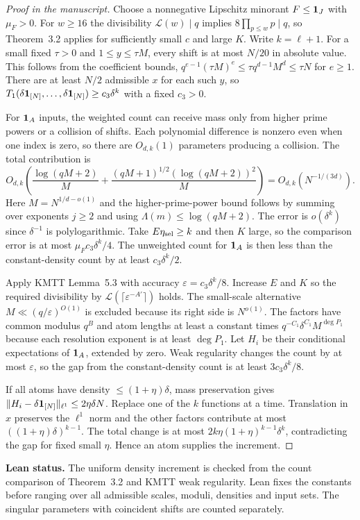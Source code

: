 \begin{proof}[Proof in the manuscript]
\leanok
{}
Choose a nonnegative Lipschitz minorant $F\le\mathbf 1_J$ with
$\mu_F>0$. For $w\ge16$ the divisibility
$\mathcal L(w)\mid q$ implies $8\prod_{p\le w}p\mid q$,
so Theorem~3.2 applies for sufficiently small $c$ and large $K$.
Write $k=\ell+1$. For a small fixed $\tau>0$ and
$1\le y\le\tau M$, every shift is at most $N/20$ in
absolute value. This follows from the coefficient bounds,
$q^{e-1}(\tau M)^e\le\tau q^{d-1}M^d\le\tau N$ for $e\ge1$.
There are at least $N/2$ admissible $x$ for each such $y$,
so
$T_1(\delta\mathbf 1_{[N]},\ldots,\delta\mathbf 1_{[N]})\ge c_3\delta^k$
with a fixed $c_3>0$.

For $\mathbf 1_A$ inputs, the weighted count can receive mass only
from higher prime powers or a collision of shifts. Each polynomial
difference is nonzero even when one index is zero, so there are
$O_{d,k}(1)$ parameters producing a collision. The total
contribution is
\[
 O_{d,k}\left(\frac{\log(qM+2)}M+
      \frac{(qM+1)^{1/2}(\log(qM+2))^2}M\right)
 =O_{d,k}(N^{-1/(3d)}) .
\]
Here $M=N^{1/d-o(1)}$ and the higher-prime-power bound
follows by summing over exponents $j\ge2$ and using
$\Lambda(m)\le\log(qM+2)$. The error is $o(\delta^k)$
since $\delta^{-1}$ is polylogarithmic. Take $E\eta_{\rm sel}\ge k$
and then $K$ large, so the comparison error is at most
$\mu_F c_3\delta^k/4$. The unweighted count for $\mathbf 1_A$
is then less than the constant-density count by at least
$c_3\delta^k/2$.

Apply KMTT Lemma~5.3 with accuracy
$\varepsilon=c_3\delta^k/8$. Increase $E$ and $K$ so the
required divisibility by $\mathcal L(\lceil\varepsilon^{-A'}\rceil)$
holds. The small-scale alternative $M\ll (q/\varepsilon)^{O(1)}$
is excluded because its right side is $N^{o(1)}$.
The factors have common modulus $q^B$ and atom lengths at
least a constant times $q^{-C_1}\delta^{C_1}M^{\deg P_1}$
because each resolution exponent is at least $\deg P_1$.
Let $H_i$ be their conditional expectations of $\mathbf 1_A$,
extended by zero. Weak regularity changes the count by at most
$\varepsilon$, so the gap from the constant-density count is
at least $3c_3\delta^k/8$.

If all atoms have density $\le(1+\eta)\delta$, mass preservation gives
$\lVert H_i-\delta\mathbf 1_{[N]}\rVert_{\ell^1}\le2\eta\delta N$.
Replace one of the $k$ functions at a time. Translation in $x$
preserves the $\ell^1$ norm and the other factors contribute at most
$((1+\eta)\delta)^{k-1}$. The total change is at most
$2k\eta(1+\eta)^{k-1}\delta^k$, contradicting the gap for fixed
small $\eta$. Hence an atom supplies the increment.
\end{proof}
\noindent\textbf{Lean status.} The uniform density increment is
checked from the count comparison of Theorem~3.2 and KMTT weak
regularity. Lean fixes the constants before ranging over all admissible
scales, moduli, densities and input sets. The singular parameters
with coincident shifts are counted separately.

